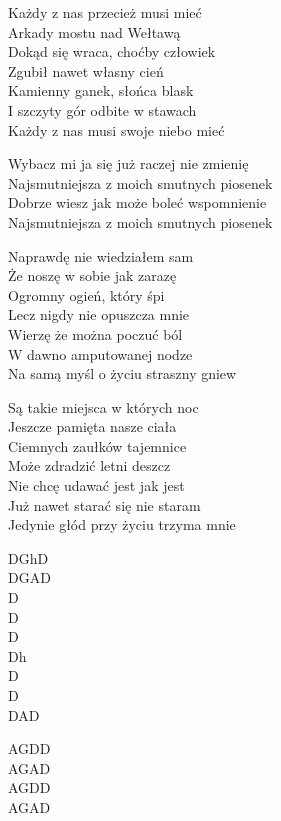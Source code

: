 \begin{text}
\hfill\break
\hfill\break
Każdy z nas przecież musi mieć\\
Arkady mostu nad Wełtawą\\
Dokąd się wraca, choćby człowiek\\
Zgubił nawet własny cień\\
Kamienny ganek, słońca blask\\
I szczyty gór odbite w stawach\\
Każdy z nas musi swoje niebo mieć

\vin Wybacz mi ja się już raczej nie zmienię\\
\vin Najsmutniejsza z moich smutnych piosenek\\
\vin Dobrze wiesz jak może boleć wspomnienie\\
\vin Najsmutniejsza z moich smutnych piosenek

Naprawdę nie wiedziałem sam\\
Że noszę w sobie jak zarazę\\
Ogromny ogień, który śpi\\
Lecz nigdy nie opuszcza mnie\\
Wierzę że można poczuć ból\\
W dawno amputowanej nodze\\
Na samą myśl o życiu straszny gniew

Są takie miejsca w których noc\\
Jeszcze pamięta nasze ciała\\
Ciemnych zaułków tajemnice\\
Może zdradzić letni deszcz\\
Nie chcę udawać jest jak jest\\
Już nawet starać się nie staram\\
Jedynie głód przy życiu trzyma mnie
\end{text}
\begin{chord}
DGhD\\
DGAD\\
D\\
D\\
D\\
Dh\\
D\\
D\\
DAD

AGDD\\
AGAD\\
AGDD\\
AGAD
\end{chord}
